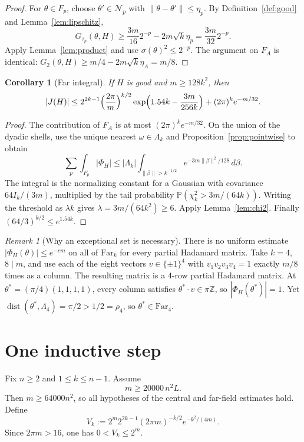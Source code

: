 \documentclass[11pt,reqno]{amsart}
\theoremstyle{plain}
\newtheorem{corollary}[theorem]{Corollary}
\theoremstyle{definition}
\theoremstyle{remark}
\newtheorem{remark}[theorem]{Remark}
\newcommand{\Z}{\mathbb Z}
\DeclareMathOperator{\dist}{dist}
\begin{document}
\begin{proof}
For \(\theta\in F_p\), choose \(\theta'\in\mathcal N_p\) with
\(\|\theta-\theta'\|\le\eta_p\). By Definition~\ref{def:good} and
Lemma~\ref{lem:lipschitz},
\[
  G_{\tau_p}(\theta,H)\ge\frac{3m}{16}2^{-p}-2m\sqrt k\eta_p
  =\frac{3m}{32}2^{-p}.
\]
Apply Lemma~\ref{lem:product} and use \(\sigma(\theta)^2\le2^{-p}\). The
argument on \(F_A\) is identical:
\(G_2(\theta,H)\ge m/4-2m\sqrt k\eta_A=m/8\).
\end{proof}

\begin{corollary}[Far integral]\label{cor:far}
If \(H\) is good and \(m\ge128k^2\), then
\[
  |J(H)|\le2^{2k-1}\Bigl(\frac{2\pi}m\Bigr)^{k/2}
    \exp\Bigl(1.54k-\frac{3m}{256k}\Bigr)+(2\pi)^ke^{-m/32}.
\]
\end{corollary}

\begin{proof}
The contribution of \(F_A\) is at most \((2\pi)^ke^{-m/32}\). On the union of
the dyadic shells, use the unique nearest \(\omega\in\Lambda_k\) and
Proposition~\ref{prop:pointwise} to obtain
\[
  \sum_p\int_{F_p}|\Phi_H|\le|\Lambda_k|
    \int_{\|\beta\|>k^{-1/2}}e^{-3m\|\beta\|^2/128}\,d\beta.
\]
The integral is the normalizing constant for a Gaussian with covariance
\(64I_k/(3m)\), multiplied by the tail probability
\(\mathbb P(\chi^2_k>3m/(64k))\). Writing the threshold as \(\lambda k\) gives
\(\lambda=3m/(64k^2)\ge6\). Apply Lemma~\ref{lem:chi2}. Finally
\((64/3)^{k/2}\le e^{1.54k}\).
\end{proof}

\begin{remark}[Why an exceptional set is necessary]\label{rem:exceptional}
There is no uniform estimate \(|\Phi_H(\theta)|\le e^{-cm}\) on all of
\(\mathrm{Far}_k\) for every partial Hadamard matrix. Take \(k=4\),
\(8\mid m\), and use each of the eight vectors \(v\in\{\pm1\}^4\) with
\(v_1v_2v_3v_4=1\) exactly \(m/8\) times as a column. The resulting matrix is a
\(4\)-row partial Hadamard matrix. At \(\theta^*=(\pi/4)(1,1,1,1)\), every
column satisfies \(\theta^*\cdot v\in\pi\Z\), so \(|\Phi_H(\theta^*)|=1\). Yet
\(\dist(\theta^*,\Lambda_4)=\pi/2>1/2=\rho_4\), so
\(\theta^*\in\mathrm{Far}_4\).
\end{remark}

\section{One inductive step}

Fix \(n\ge2\) and \(1\le k\le n-1\). Assume
\begin{equation}\label{eq:regime}
  m\ge20000\,n^2L.
\end{equation}
Then \(m\ge64000n^2\), so all hypotheses of the central and far-field estimates
hold. Define
\begin{equation}\label{eq:V}
  V_k:=2^m2^{2k-1}(2\pi m)^{-k/2}e^{-k^2/(4m)}.
\end{equation}
Since \(2\pi m>16\), one has \(0<V_k\le2^m\).
\end{document}
